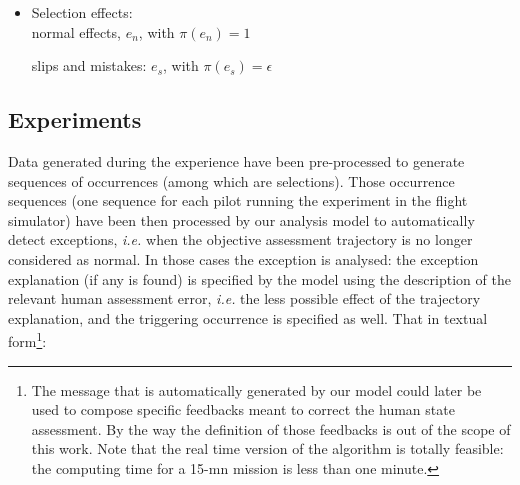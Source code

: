 \begin{itemize}
\item Selection effects: \\
normal effects, $e_{n}$, with $\pi(e_n)=1$
slips and mistakes: $e_{s}$, with $\pi(e_s)=\epsilon$

\end{itemize}

\subsection{Experiments}
Data generated during the experience 
have been pre-processed to generate sequences of occurrences 
(among which are selections). 
Those occurrence sequences 
(one sequence for each pilot running the experiment in the flight simulator) 
have been then processed by our analysis model to automatically detect exceptions, 
\textit{i.e.} when the objective assessment trajectory is no longer considered as normal. 
In those cases the exception is analysed: 
the exception explanation (if any is found) 
is specified by the model using the description 
of the relevant human assessment error, \textit{i.e.} the less possible effect of the trajectory explanation, 
and the triggering occurrence is specified as well. 
That in textual form\footnote{The message that is automatically 
generated by our model could later be used to compose specific feedbacks meant to 
correct the human state assessment. By the way the definition of those 
feedbacks is out of the scope of this work. Note that the real time version of 
the algorithm is totally feasible: the computing time for a 15-mn mission is 
less than one minute.}:

